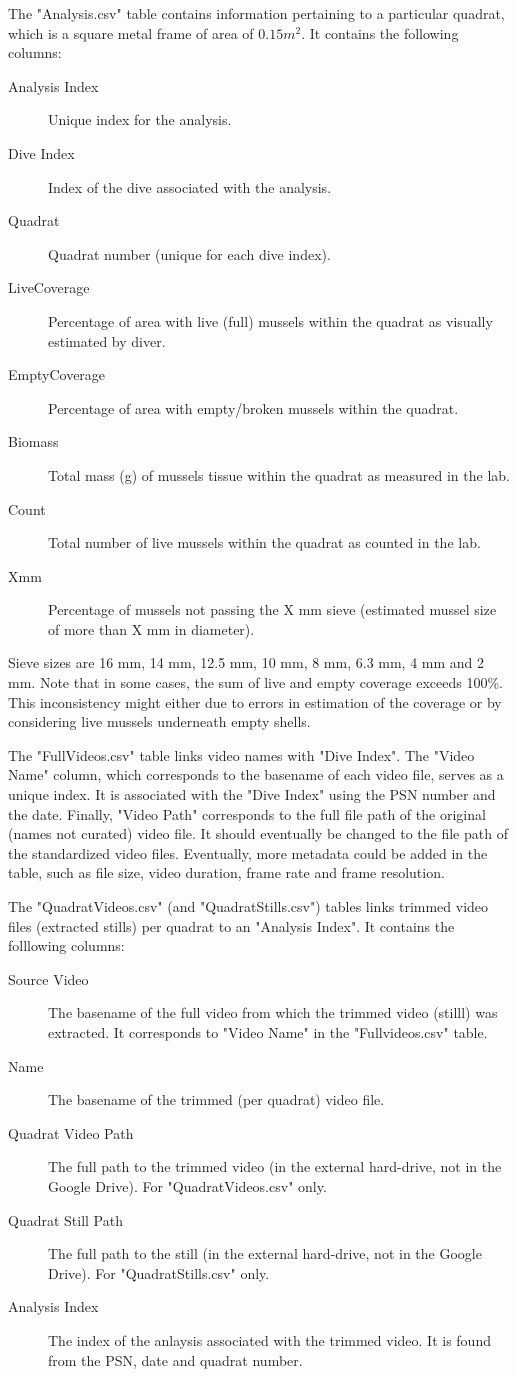 \documentclass[11pt]{article} %
\begin{document}
The "Analysis.csv" table contains information pertaining to a particular quadrat, which is a square metal frame of area of $0.15 m^2$. It contains the following columns:
\begin{description}
\item[Analysis Index] Unique index for the analysis.
\item[Dive Index] Index of the dive associated with the analysis.
\item[Quadrat] Quadrat number (unique for each dive index).
\item[LiveCoverage] Percentage of area with live (full) mussels within the quadrat as visually estimated by diver.
\item[EmptyCoverage] Percentage of area with empty/broken mussels within the quadrat.
\item[Biomass] Total mass (g) of mussels tissue within the quadrat as measured in the lab.
\item[Count] Total number of live mussels within the quadrat as counted in the lab.
\item[Xmm] Percentage of mussels not passing the X mm sieve (estimated mussel size of more than X mm in diameter).
\end{description}
Sieve sizes are 16 mm, 14 mm, 12.5 mm, 10 mm, 8 mm, 6.3 mm, 4 mm and 2 mm. Note that in some cases, the sum of live and empty coverage exceeds 100\%. This inconsistency might either due to errors in estimation of the coverage or by considering live mussels underneath empty shells.

The "FullVideos.csv" table links video names with "Dive Index". The "Video Name" column, which corresponds to the basename of each video file, serves as a unique index. It is associated with the "Dive Index" using the PSN number and the date. Finally, "Video Path" corresponds to the full file path of the original (names not curated) video file. It should eventually be changed to the file path of the standardized video files. Eventually, more metadata could be added in the table, such as file size, video duration, frame rate and frame resolution.

The "QuadratVideos.csv" (and "QuadratStills.csv") tables links trimmed video files (extracted stills) per quadrat to an "Analysis Index". It contains the folllowing columns:
\begin{description}
\item[Source Video] The basename of the full video from which the trimmed video (stilll) was extracted. It corresponds to "Video Name" in the "Fullvideos.csv" table.
\item[Name] The basename of the trimmed (per quadrat) video file.
\item[Quadrat Video Path] The full path to the trimmed video (in the external hard-drive, not in the Google Drive). For "QuadratVideos.csv" only.
\item[Quadrat Still Path] The full path to the still (in the external hard-drive, not in the Google Drive). For "QuadratStills.csv" only.
\item[Analysis Index] The index of the anlaysis associated with the trimmed video. It is found from the PSN, date and quadrat number.
\end{description}
\end{document}
